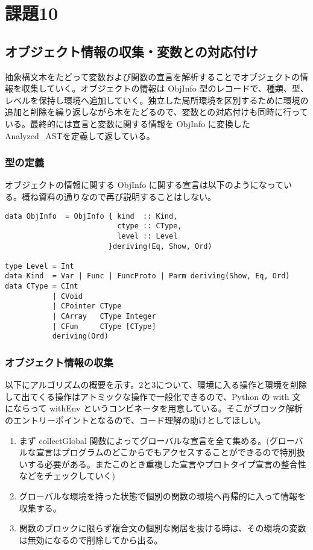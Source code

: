 \documentclass{jsarticle}
\begin{document}
\section{課題10}
\subsection{オブジェクト情報の収集・変数との対応付け}
抽象構文木をたどって変数および関数の宣言を解析することでオブジェクトの情報を収集していく。オブジェクトの情報は ObjInfo 型のレコードで、種類、型、レベルを保持し環境へ追加していく。独立した局所環境を区別するために環境の追加と削除を繰り返しながら木をたどるので、変数との対応付けも同時に行っている。最終的には宣言と変数に関する情報を ObjInfo に変換した Analyzed\_ASTを定義して返している。

\subsubsection{型の定義}
オブジェクトの情報に関する ObjInfo に関する宣言は以下のようになっている。概ね資料の通りなので再び説明することはしない。
\begin{verbatim}
data ObjInfo  = ObjInfo { kind  :: Kind,
                          ctype :: CType,
                          level :: Level
                        }deriving(Eq, Show, Ord)

type Level = Int
data Kind  = Var | Func | FuncProto | Parm deriving(Show, Eq, Ord)
data CType = CInt
           | CVoid
           | CPointer CType
           | CArray   CType Integer
           | CFun     CType [CType]
           deriving(Ord)
\end{verbatim}

\subsubsection{オブジェクト情報の収集}
以下にアルゴリズムの概要を示す。2と3について、環境に入る操作と環境を削除して出てくる操作はアトミックな操作で一般化できるので、Python の with 文にならって withEnv というコンビネータを用意している。そこがブロック解析のエントリーポイントとなるので、コード理解の助けとしてほしい。
\begin{enumerate}
\item まず collectGlobal 関数によってグローバルな宣言を全て集める。(グローバルな宣言はプログラムのどこからでもアクセスすることができるので特別扱いする必要がある。またこのとき重複した宣言やプロトタイプ宣言の整合性などをチェックしていく)
\item グローバルな環境を持った状態で個別の関数の環境へ再帰的に入って情報を収集する。
\item 関数のブロックに限らず複合文の個別な閑居を抜ける時は、その環境の変数は無効になるので削除してから出る。
\end{enumerate}
\end{document}
